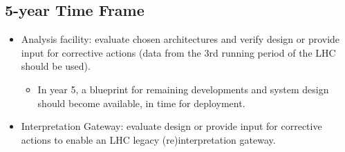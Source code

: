 \documentclass[12pt,a4paper]{article}
\begin{document}
\subsection{5-year Time Frame}

\begin{itemize}
\item Analysis facility: evaluate chosen architectures and verify design or provide input for corrective actions (data from the 3rd running period of the LHC should be used).
\begin{itemize}
\item In year 5, a blueprint for remaining developments and system design should become available, in time for deployment.
\end{itemize}
\item Interpretation Gateway: evaluate design or provide input for corrective actions to enable an LHC legacy (re)interpretation gateway.
\end{itemize}

\sloppy
\raggedright
\clearpage
\printbibliography[title={References},heading=bibintoc]
\end{document}
